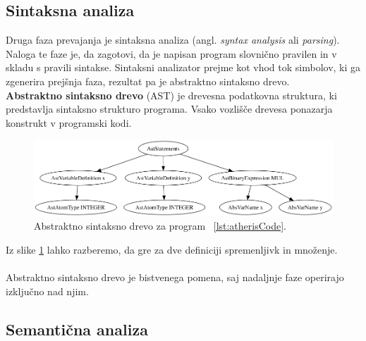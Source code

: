 \documentclass[a4paper, 12p]{book}
\begin{document}
\subsection{Sintaksna analiza}

Druga faza prevajanja je sintaksna analiza (angl. \textit{syntax analysis} ali \textit{parsing}). Naloga te faze je, da zagotovi, da je napisan program slovnično pravilen in v skladu s pravili sintakse. Sintaksni analizator prejme kot vhod tok simbolov, ki ga zgenerira prejšnja faza, rezultat pa je abstraktno sintaksno drevo. \\

\textbf{Abstraktno sintaksno drevo} (AST) je drevesna podatkovna struktura, ki predstavlja sintaksno strukturo programa. Vsako vozlišče drevesa ponazarja konstrukt v programski kodi.\\

\begin{figure}[h]
	\begin{center}
		\includegraphics[width=1\textwidth]{resources/ast.png}
	\end{center}
	\caption{Abstraktno sintaksno drevo za program ~\ref{lst:atherisCode}.}
	\label{image:abstractSyntaxTree}
\end{figure}

Iz slike \ref{image:abstractSyntaxTree} lahko razberemo, da gre za dve definiciji spremenljivk in množenje.\\\\
\indent Abstraktno sintaksno drevo je bistvenega pomena, saj nadaljnje faze operirajo izključno nad njim.

\subsection{Semantična analiza} \label{semanSection}
\end{document}
